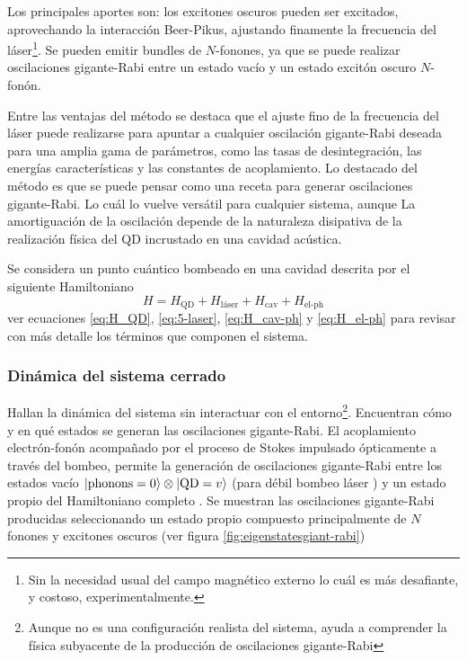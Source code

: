 \documentclass[main.tex]{subfiles}
\begin{document}
Los principales aportes son: los excitones oscuros pueden ser excitados, aprovechando la interacción Beer-Pikus, ajustando finamente la frecuencia del láser\footnote{Sin la necesidad usual del campo magnético externo \parencite{Jimenez2017} lo cuál es más desafiante, y costoso, experimentalmente.}. Se pueden emitir bundles de $N$-fonones, ya que se puede realizar oscilaciones gigante-Rabi entre un estado vacío y un estado excitón oscuro $N$-fonón.

Entre las ventajas del método se destaca que el ajuste fino de la frecuencia del láser puede realizarse para apuntar a cualquier oscilación gigante-Rabi deseada para una amplia gama de parámetros, como las tasas de desintegración, las energías características y las constantes de acoplamiento. Lo destacado del método es que se puede pensar como una receta para generar oscilaciones gigante-Rabi. Lo cuál lo vuelve versátil para cualquier sistema, aunque La amortiguación de la oscilación depende de la naturaleza disipativa de la realización física del QD incrustado en una cavidad acústica.

Se considera un punto cuántico bombeado en una cavidad descrita por el siguiente Hamiltoniano \parencite{Bin2020}
\begin{equation}
	H = H_\text{QD} + H_\text{láser} + H_\text{cav} + H_\text{el-ph}
\end{equation}
ver ecuaciones \ref{eq:H_QD}, \ref{eq:5-laser}, \ref{eq:H_cav-ph} y \ref{eq:H_el-ph} para revisar con más detalle los términos que componen el sistema.

\subsubsection{Dinámica del sistema cerrado}
Hallan la dinámica del sistema sin interactuar con el entorno\footnote{Aunque no es una configuración realista del sistema, ayuda a comprender la física subyacente de la producción de oscilaciones gigante-Rabi}. Encuentran cómo y en qué estados se generan las oscilaciones gigante-Rabi. El acoplamiento electrón-fonón acompañado por el proceso de Stokes impulsado ópticamente a través del bombeo, permite la generación de oscilaciones gigante-Rabi entre los estados vacío $\ket{\text{phonons}=0}\otimes \ket{\text{QD}=v}$ (para débil bombeo láser ) y un estado propio del Hamiltoniano completo \parencite{Bin2020}. Se muestran las oscilaciones gigante-Rabi producidas seleccionando un estado propio compuesto principalmente de $N$ fonones y excitones oscuros (ver figura \ref{fig:eigenstatesgiant-rabi})
\end{document}

